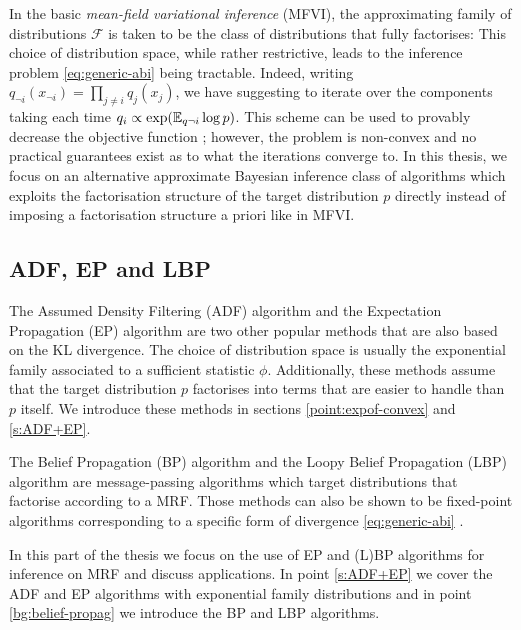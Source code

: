 In the basic \emph{mean-field variational inference} (MFVI), the approximating family of distributions $\mathcal F$ is taken to be the class of distributions that fully factorises:
%
% 
This choice of distribution space, while rather restrictive, leads to the inference problem \eqref{eq:generic-abi} being tractable. Indeed, writing $q_{\neg i}(x_{\neg i}) = \prod_{j\neq i} q_{j}(x_{j}) $, we have
suggesting to iterate over the components taking each time $q_{i} \propto \exp(\mathbb E_{q\neg i} \log p) $. This scheme can be used to provably decrease the objective function \citep{hoffman13, kucukelbir16, blei16}; however, the problem is non-convex and no practical guarantees exist as to what the iterations converge to. 
In this thesis, we focus on an alternative approximate Bayesian inference class of algorithms which exploits the factorisation structure of the target distribution $p$ directly instead of imposing a factorisation structure a priori like in MFVI.

\subsection{ADF, EP and LBP}
The Assumed Density Filtering (ADF) algorithm and the  Expectation Propagation (EP) algorithm are two other popular methods that are also based on the KL divergence. The choice of distribution space is usually the exponential family associated to a sufficient statistic $\phi$. Additionally, these methods assume that the target distribution $p$ factorises into terms that are easier to handle than $p$ itself. We introduce these methods in sections \ref{point:expof-convex} and \ref{s:ADF+EP}.

The Belief Propagation (BP) algorithm and the Loopy Belief Propagation (LBP) algorithm are message-passing algorithms which target distributions that factorise according to a MRF. Those methods can also be shown to be fixed-point algorithms corresponding to a specific form of divergence \eqref{eq:generic-abi} \citep{yedidia01, yedidia02}.

In this part of the thesis we focus on the use of EP and (L)BP algorithms for inference on MRF and discuss applications. In point \ref{s:ADF+EP} we cover the ADF and EP algorithms with exponential family distributions and in point \ref{bg:belief-propag} we introduce the BP and LBP algorithms.




